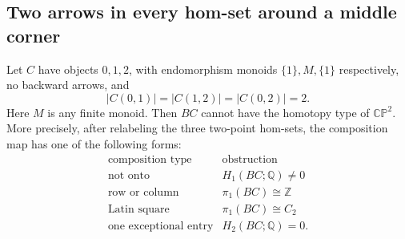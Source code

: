 \subsection{Two arrows in every hom-set around a middle corner}

\begin{theorem}
\label{C:middle-double-homs}
Let $C$ have objects $0,1,2$, with endomorphism monoids
$\{1\},M,\{1\}$ respectively, no backward arrows, and
\[
 |C(0,1)|=|C(1,2)|=|C(0,2)|=2.
\]
Here $M$ is any finite monoid.  Then $BC$ cannot have the
homotopy type of $\mathbb{CP}^2$.
More precisely, after relabeling the three two-point hom-sets,
the composition map has one of the following forms:
\[
\begin{array}{c|c}
\text{composition type}&\text{obstruction}\\\hline
\text{not onto}&H_1(BC;\mathbb Q)\ne0\\
\text{row or column}&\pi_1(BC)\cong\mathbb Z\\
\text{Latin square}&\pi_1(BC)\cong C_2\\
\text{one exceptional entry}&H_2(BC;\mathbb Q)=0.
\end{array}
\]
\end{theorem}
